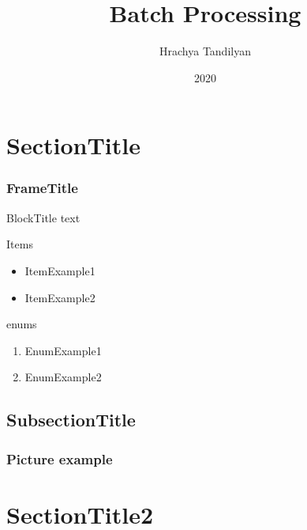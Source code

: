 \documentclass{beamer}
\begin{document}
\title[Batch Processing]{Batch Processing}
\author[Hrachya Tandilyan\copyright]{Hrachya Tandilyan}
\date{2020}

\begin{frame}
\titlepage
\end{frame}

\section{SectionTitle}
\begin{frame}\frametitle{FrameTitle}
\begin{block}{BlockTitle}
    text
\end{block}
\vfill
Items
\begin{itemize}
    \item ItemExample1
    \item ItemExample2
\end{itemize}
\vfill
enums
\begin{enumerate}
    \item EnumExample1
    \item EnumExample2
\end{enumerate}
\end{frame}

\subsection{SubsectionTitle}
\begin{frame}\frametitle{Picture example}
\end{frame}

\section{SectionTitle2}
\end{document}
